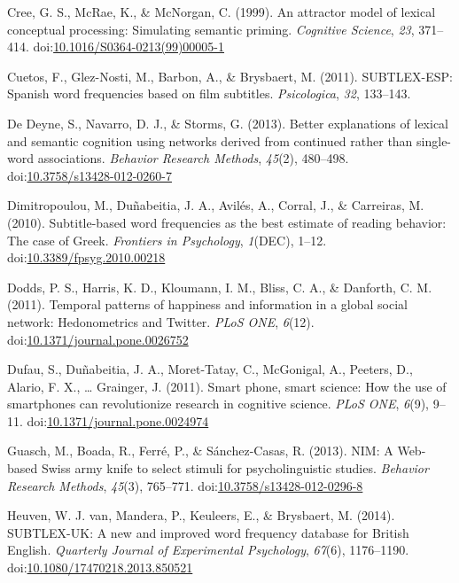 \documentclass[english,man]{apa6}
\theoremstyle{definition}
\theoremstyle{definition}
\theoremstyle{definition}
\theoremstyle{remark}
\begin{document}
\hypertarget{ref-Cree1999}{}
Cree, G. S., McRae, K., \& McNorgan, C. (1999). An attractor model of
lexical conceptual processing: Simulating semantic priming.
\emph{Cognitive Science}, \emph{23}, 371--414.
doi:\href{https://doi.org/10.1016/S0364-0213(99)00005-1}{10.1016/S0364-0213(99)00005-1}

\hypertarget{ref-Cuetos2011}{}
Cuetos, F., Glez-Nosti, M., Barbon, A., \& Brysbaert, M. (2011).
SUBTLEX-ESP: Spanish word frequencies based on film subtitles.
\emph{Psicologica}, \emph{32}, 133--143.

\hypertarget{ref-DeDeyne2013}{}
De Deyne, S., Navarro, D. J., \& Storms, G. (2013). Better explanations
of lexical and semantic cognition using networks derived from continued
rather than single-word associations. \emph{Behavior Research Methods},
\emph{45}(2), 480--498.
doi:\href{https://doi.org/10.3758/s13428-012-0260-7}{10.3758/s13428-012-0260-7}

\hypertarget{ref-Dimitropoulou2010}{}
Dimitropoulou, M., Duñabeitia, J. A., Avilés, A., Corral, J., \&
Carreiras, M. (2010). Subtitle-based word frequencies as the best
estimate of reading behavior: The case of Greek. \emph{Frontiers in
Psychology}, \emph{1}(DEC), 1--12.
doi:\href{https://doi.org/10.3389/fpsyg.2010.00218}{10.3389/fpsyg.2010.00218}

\hypertarget{ref-Dodds2011}{}
Dodds, P. S., Harris, K. D., Kloumann, I. M., Bliss, C. A., \& Danforth,
C. M. (2011). Temporal patterns of happiness and information in a global
social network: Hedonometrics and Twitter. \emph{PLoS ONE},
\emph{6}(12).
doi:\href{https://doi.org/10.1371/journal.pone.0026752}{10.1371/journal.pone.0026752}

\hypertarget{ref-Dufau2011}{}
Dufau, S., Duñabeitia, J. A., Moret-Tatay, C., McGonigal, A., Peeters,
D., Alario, F. X., \ldots{} Grainger, J. (2011). Smart phone, smart
science: How the use of smartphones can revolutionize research in
cognitive science. \emph{PLoS ONE}, \emph{6}(9), 9--11.
doi:\href{https://doi.org/10.1371/journal.pone.0024974}{10.1371/journal.pone.0024974}

\hypertarget{ref-Guasch2013}{}
Guasch, M., Boada, R., Ferré, P., \& Sánchez-Casas, R. (2013). NIM: A
Web-based Swiss army knife to select stimuli for psycholinguistic
studies. \emph{Behavior Research Methods}, \emph{45}(3), 765--771.
doi:\href{https://doi.org/10.3758/s13428-012-0296-8}{10.3758/s13428-012-0296-8}

\hypertarget{ref-VanHeuven2014}{}
Heuven, W. J. van, Mandera, P., Keuleers, E., \& Brysbaert, M. (2014).
SUBTLEX-UK: A new and improved word frequency database for British
English. \emph{Quarterly Journal of Experimental Psychology},
\emph{67}(6), 1176--1190.
doi:\href{https://doi.org/10.1080/17470218.2013.850521}{10.1080/17470218.2013.850521}
\end{document}
